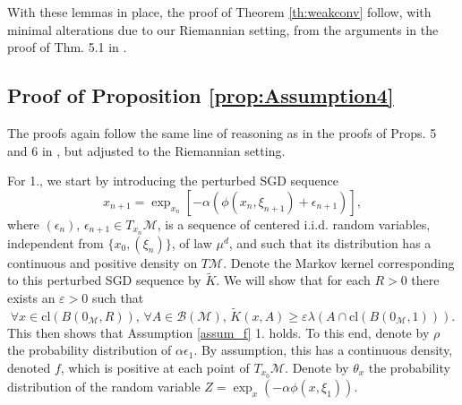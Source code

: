 \documentclass{article}
\newcommand{\CM}{\mathcal{M}}
\newcommand{\BN}{\mathbb{N}}
\begin{document}
With these lemmas in place, the proof of Theorem \ref{th:weakconv} follow, with minimal alterations due to our Riemannian setting, from the arguments in the proof of Thm. 5.1 in \cite{bianchi2019constant}. 




\subsection{Proof of Proposition \ref{prop:Assumption4}}
The proofs again follow the same line of reasoning as in the proofs of Props. 5 and 6 in \cite{bianchi2022convergence}, but adjusted to the Riemannian setting. 

For 1., we start by introducing the perturbed SGD sequence
\begin{equation}
    x_{n+1}=\exp_{x_n}\left[-\alpha(\phi(x_n,\xi_{n+1})+\epsilon_{n+1})\right],
\end{equation}
where $(\epsilon_n)$, $\epsilon_{n+1}\in T_{x_n}\CM$, is a sequence of centered i.i.d. random variables, independent from $\{x_0,(\xi_n)\}$, of law $\mu^d$, and such that its distribution has a continuous and positive density on $T\CM$. Denote the Markov kernel corresponding to this perturbed SGD sequence by $\tilde K$. We will show that for each $R>0$ there exists an $\varepsilon >0$ such that 
\begin{equation}
    \forall x\in\text{cl}(B(0_\CM,R)),\,\forall A\in\mathcal{B}(\CM),\,\tilde K(x,A)\geq \varepsilon\lambda(A\cap \text{cl}(B(0_\CM,1))).
\end{equation}
This then shows that Assumption \ref{assum_f} 1. holds. To this end, denote by $\rho$ the probability distribution of $\alpha\epsilon_1$. By assumption, this has a continuous density, denoted $f$, which is positive at each point of $T_{x_0}\CM$. Denote by $\theta_x$ the probability distribution of the random variable $Z=\exp_x(-\alpha\phi(x,\xi_1))$.
\end{document}

